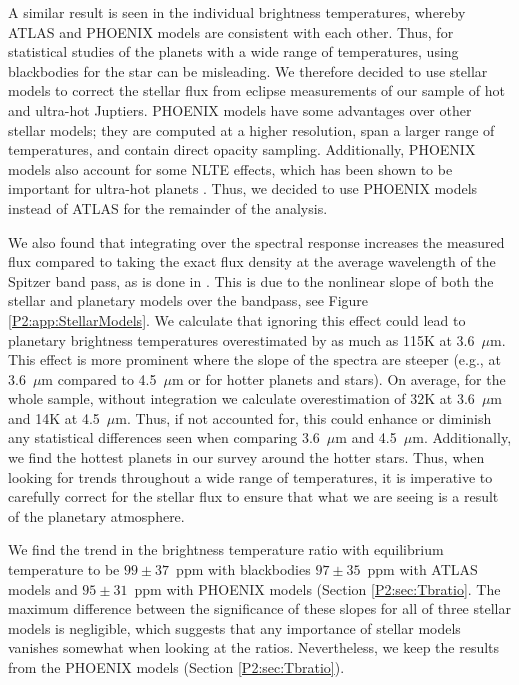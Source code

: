 \begin{subappendices}
A similar result is seen in the individual brightness temperatures, whereby ATLAS and PHOENIX models are consistent with each other. Thus, for statistical studies of the planets with a wide range of temperatures, using blackbodies for the star can be misleading. We therefore decided to use stellar models to correct the stellar flux from eclipse measurements of our sample of hot and ultra-hot Juptiers. PHOENIX models have some advantages over other stellar models; they are computed at a higher resolution, span a larger range of temperatures, and contain direct opacity sampling. Additionally, PHOENIX models also account for some NLTE effects, which has been shown to be important for ultra-hot planets \citep{Lothringer2019}. Thus, we decided to use PHOENIX models instead of ATLAS for the remainder of the analysis.

We also found that integrating over the spectral response increases the measured flux compared to taking the exact flux density at the average wavelength of the Spitzer band pass, as is done in \citet{Schwartz2015}. This is due to the nonlinear slope of both the stellar and planetary models over the bandpass, see Figure \ref{P2:app:StellarModels}. We calculate that ignoring this effect could lead to  planetary brightness temperatures overestimated by as much as 115K at 3.6~$\mu$m. This effect is more prominent where the slope of the spectra are steeper (e.g., at 3.6~$\mu$m compared to 4.5~$\mu$m or for hotter planets and stars). On average, for the whole sample, without integration we calculate overestimation of 32K at 3.6~$\mu$m and 14K at 4.5~$\mu$m. Thus, if not accounted for, this could enhance or diminish any statistical differences seen when comparing 3.6~$\mu$m and 4.5~$\mu$m. Additionally,  we find the hottest planets in our survey around the hotter stars. Thus, when looking for trends throughout a wide range of temperatures, it is imperative to carefully correct for the stellar flux  to ensure that what we are seeing is a result of the planetary atmosphere.

We find the trend in the brightness temperature ratio with equilibrium temperature to be $99\pm37$~ppm with blackbodies $97\pm35$~ppm with ATLAS models and $95\pm31$~ppm with PHOENIX models (Section \ref{P2:sec:Tbratio}. The maximum difference between the significance of these slopes for all of three stellar models is negligible, which suggests that any importance of stellar models  vanishes somewhat when looking at the ratios. Nevertheless, we keep the results from the PHOENIX models (Section \ref{P2:sec:Tbratio}).


\end{subappendices}
